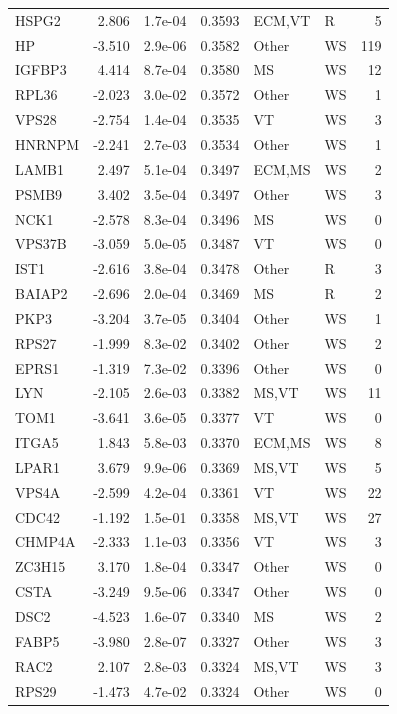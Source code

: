 \begin{table}[ht]
\begin{tabular}{lrlrllr}
  HSPG2 & 2.806 & 1.7e-04 & 0.3593 & ECM,VT & R & 5 \\ 
  HP & -3.510 & 2.9e-06 & 0.3582 & Other & WS & 119 \\ 
  IGFBP3 & 4.414 & 8.7e-04 & 0.3580 & MS & WS & 12 \\ 
  RPL36 & -2.023 & 3.0e-02 & 0.3572 & Other & WS & 1 \\ 
  VPS28 & -2.754 & 1.4e-04 & 0.3535 & VT & WS & 3 \\ 
  HNRNPM & -2.241 & 2.7e-03 & 0.3534 & Other & WS & 1 \\ 
  LAMB1 & 2.497 & 5.1e-04 & 0.3497 & ECM,MS & WS & 2 \\ 
  PSMB9 & 3.402 & 3.5e-04 & 0.3497 & Other & WS & 3 \\ 
  NCK1 & -2.578 & 8.3e-04 & 0.3496 & MS & WS & 0 \\ 
  VPS37B & -3.059 & 5.0e-05 & 0.3487 & VT & WS & 0 \\ 
  IST1 & -2.616 & 3.8e-04 & 0.3478 & Other & R & 3 \\ 
  BAIAP2 & -2.696 & 2.0e-04 & 0.3469 & MS & R & 2 \\ 
  PKP3 & -3.204 & 3.7e-05 & 0.3404 & Other & WS & 1 \\ 
  RPS27 & -1.999 & 8.3e-02 & 0.3402 & Other & WS & 2 \\ 
  EPRS1 & -1.319 & 7.3e-02 & 0.3396 & Other & WS & 0 \\ 
  LYN & -2.105 & 2.6e-03 & 0.3382 & MS,VT & WS & 11 \\ 
  TOM1 & -3.641 & 3.6e-05 & 0.3377 & VT & WS & 0 \\ 
  ITGA5 & 1.843 & 5.8e-03 & 0.3370 & ECM,MS & WS & 8 \\ 
  LPAR1 & 3.679 & 9.9e-06 & 0.3369 & MS,VT & WS & 5 \\ 
  VPS4A & -2.599 & 4.2e-04 & 0.3361 & VT & WS & 22 \\ 
  CDC42 & -1.192 & 1.5e-01 & 0.3358 & MS,VT & WS & 27 \\ 
  CHMP4A & -2.333 & 1.1e-03 & 0.3356 & VT & WS & 3 \\ 
  ZC3H15 & 3.170 & 1.8e-04 & 0.3347 & Other & WS & 0 \\ 
  CSTA & -3.249 & 9.5e-06 & 0.3347 & Other & WS & 0 \\ 
  DSC2 & -4.523 & 1.6e-07 & 0.3340 & MS & WS & 2 \\ 
  FABP5 & -3.980 & 2.8e-07 & 0.3327 & Other & WS & 3 \\ 
  RAC2 & 2.107 & 2.8e-03 & 0.3324 & MS,VT & WS & 3 \\ 
  RPS29 & -1.473 & 4.7e-02 & 0.3324 & Other & WS & 0 \\ 

\end{tabular}
\end{table}
